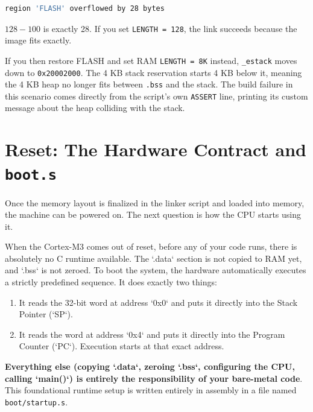 \begin{lstlisting}[language=bash]
region 'FLASH' overflowed by 28 bytes
\end{lstlisting}

$128 - 100$ is exactly 28. If you set \texttt{LENGTH = 128}, the link succeeds because the image fits exactly.

If you then restore FLASH and set RAM \texttt{LENGTH = 8K} instead, \texttt{\_estack} moves down to \texttt{0x20002000}. The 4 KB stack reservation starts 4 KB below it, meaning the 4 KB heap no longer fits between \texttt{.bss} and the stack. The build failure in this scenario comes directly from the script's own \texttt{ASSERT} line, printing its custom message about the heap colliding with the stack.

\section{Reset: The Hardware Contract and \texttt{boot.s}}
Once the memory layout is finalized in the linker script and loaded into memory, the machine can be powered on. The next question is how the CPU starts using it.

When the Cortex-M3 comes out of reset, before any of your code runs, there is absolutely no C runtime available. The `.data` section is not copied to RAM yet, and `.bss` is not zeroed. To boot the system, the hardware automatically executes a strictly predefined sequence. It does exactly two things:
\begin{enumerate}
    \item It reads the 32-bit word at address `0x0` and puts it directly into the Stack Pointer (`SP`).
    \item It reads the word at address `0x4` and puts it directly into the Program Counter (`PC`). Execution starts at that exact address.
\end{enumerate}

\textbf{Everything else (copying `.data`, zeroing `.bss`, configuring the CPU, calling `main()`) is entirely the responsibility of your bare-metal code}. This foundational runtime setup is written entirely in assembly in a file named \texttt{boot/startup.s}.

